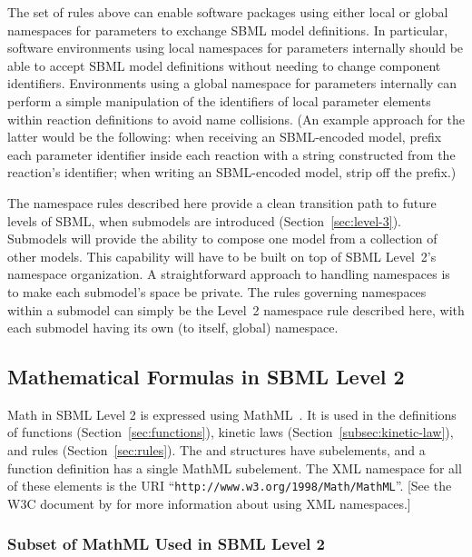 \documentclass[10pt,twocolumntoc]{cekarticle}
\begin{document}
The set of rules above can enable software packages using either
local or global namespaces for parameters to exchange SBML model definitions. In particular, software environments using local namespaces for parameters
internally should be able to accept SBML model definitions without
needing to change component identifiers. Environments using a
global namespace for parameters internally can perform a simple manipulation of the identifiers of local parameter elements within reaction definitions to avoid name collisions.  (An example approach for the latter would be the
following: when receiving an SBML-encoded model, prefix each
parameter identifier inside each reaction with a string constructed from the
reaction's identifier; when writing an SBML-encoded model, strip
off the prefix.)

The namespace rules described here provide a clean transition path
to future levels of SBML, when submodels are introduced
(Section~\ref{sec:level-3}).  Submodels will provide the ability
to compose one model from a collection of other models.  This
capability will have to be built on top of SBML Level~2's
namespace organization.  A straightforward approach to handling
namespaces is to make each submodel's space be private.  The rules
governing namespaces within a submodel can simply be the Level~2
namespace rule described here, with each submodel having its own
(to itself, global) namespace.

\subsection{Mathematical Formulas in SBML Level 2}
\label{sec:formulas}

Math in SBML Level 2 is expressed using MathML~\citep{w3c:2000b}.  It is
used in the definitions of functions (Section~\ref{sec:functions}), kinetic
laws (Section~\ref{subsec:kinetic-law}), and rules
(Section~\ref{sec:rules}).  The  and 
structures have  subelements, and a function definition has a
single MathML  subelement.  The XML namespace for all of
these elements is the URI ``\texttt{http://www.w3.org/1998/Math/MathML}''.
[See the W3C document by \citet{bray:1999} for more information about using
XML namespaces.]

\subsubsection{Subset of MathML Used in SBML Level 2}
\end{document}
